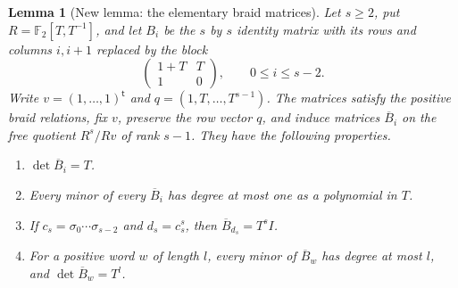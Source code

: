 \documentclass[11pt,oneside]{report}
\newtheorem{lemma}[theorem]{Lemma}
\theoremstyle{definition}
\numberwithin{equation}{section}
\begin{document}
\begin{lemma}[New lemma: the elementary braid matrices]
\label{J15:lem:burau-elementary}
Let $s\geq2$, put $R=\mathbb F_2[T,T^{-1}]$, and let $B_i$ be the
$s$ by $s$ identity matrix with its rows and columns $i,i+1$ replaced
by the block
\[
 \begin{pmatrix}1+T&T\\1&0\end{pmatrix},
 \qquad 0\leq i\leq s-2.
\]
Write $v=(1,\ldots,1)^{\mathsf t}$ and
$q=(1,T,\ldots,T^{s-1})$.
The matrices satisfy the positive braid relations, fix $v$, preserve
the row vector $q$, and induce matrices $\overline B_i$ on the free
quotient $R^s/Rv$ of rank $s-1$. They have the following properties.
\begin{enumerate}
\item $\det\overline B_i=T$.
\item Every minor of every $\overline B_i$ has degree at most one
as a polynomial in $T$.
\item If $c_s=\sigma_0\cdots\sigma_{s-2}$ and $d_s=c_s^s$,
then $\overline B_{d_s}=T^sI$.
\item For a positive word $w$ of length $l$, every minor of
$\overline B_w$ has degree at most $l$, and
$\det\overline B_w=T^l$.
\end{enumerate}
\end{lemma}
\end{document}
